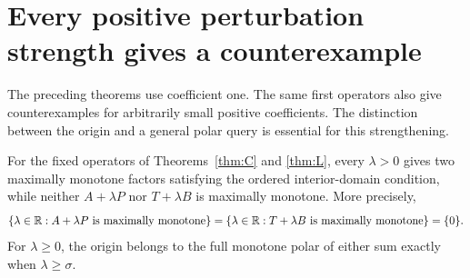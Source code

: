 \section{Every positive perturbation strength gives a counterexample}
\label{sec:parameters}
The preceding theorems use coefficient one. The same first operators
also give counterexamples for arbitrarily small positive coefficients.
The distinction between the origin and a general polar query is essential
for this strengthening.

\begin{proposition}\label{prop:all-strengths}
For the fixed operators of Theorems~\ref{thm:C} and \ref{thm:L}, every
$\lambda>0$ gives two maximally monotone factors satisfying the ordered
interior-domain condition, while neither $A+\lambda P$ nor $T+\lambda B$
is maximally monotone. More precisely,
\[
\{\lambda\in\mathbb R:A+\lambda P\text{ is maximally monotone}\}
=\{\lambda\in\mathbb R:T+\lambda B\text{ is maximally monotone}\}
=\{0\}.
\]
For $\lambda\ge0$, the origin belongs to the full monotone polar of
either sum exactly when $\lambda\ge\sigma$.
\end{proposition}
